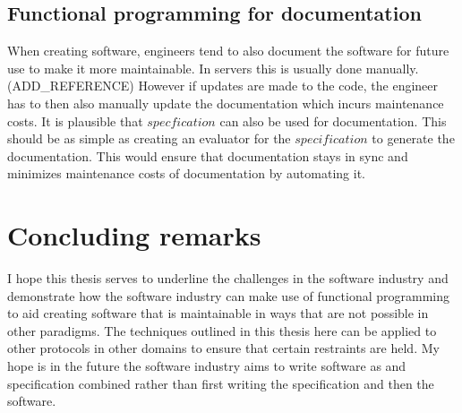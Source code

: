 \subsection{Functional programming for documentation}

When creating software, engineers tend to also document the software for future
use to make it more maintainable. In servers this is usually done manually.
(ADD\_REFERENCE) However if updates are made to the code, the engineer has to
then also manually update the documentation which incurs maintenance costs. It
is plausible that $specfication$ can also be used for documentation. This
should be as simple as creating an evaluator for the $specification$ to
generate the documentation. This would ensure that documentation stays in sync
and minimizes maintenance costs of documentation by automating it.

\section{Concluding remarks}

I hope this thesis serves to underline the challenges in the software industry
and demonstrate how the software industry can make use of functional programming
to aid creating software that is maintainable in ways that are not possible in
other paradigms. The techniques outlined in this thesis here can be applied to
other protocols in other domains to ensure that certain restraints are held. My
hope is in the future the software industry aims to write software as and
specification combined rather than first writing the specification and then the
software. 
